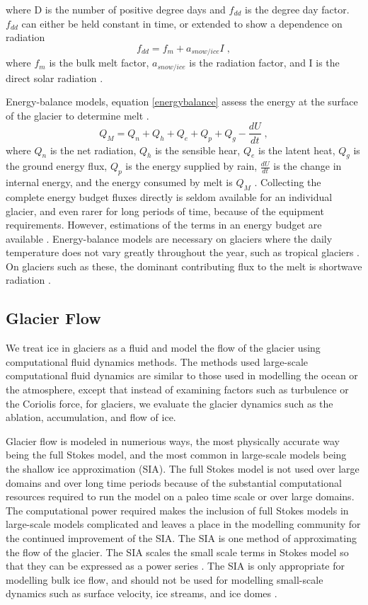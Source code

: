 \documentclass{article}
\begin{document}
where D is the number of positive degree days and $f_{dd}$ is the degree day factor. $f_{dd}$ can either be held constant in time, or extended to show a dependence on radiation
\begin{equation}
f_{dd} = f_m+ a_{snow/ice}I \; ,
\end{equation}
 where $f_m$ is the bulk melt factor, $a_{snow/ice}$ is the radiation factor, and I is the direct solar radiation \citep{Clarke2015}. 

Energy-balance models, equation \ref{energybalance} assess the energy at the surface of the glacier to determine melt \citep{Hock2005}. 
\begin{equation}\label{energybalance}
Q_M = Q_n+Q_h+Q_e+Q_p+Q_g-\frac{dU}{dt} \; ,
\end{equation}
where $Q_n$ is the net radiation, $Q_h$ is the sensible hear, $Q_e$ is the latent heat, $Q_g$ is the ground energy flux, $Q_p$ is the energy supplied by rain, $\frac{dU}{dt}$ is the change in internal energy, and the energy consumed by melt is $Q_M$ \citep{Hock2005, Hooke2013}.  Collecting the complete energy budget fluxes directly is seldom available for an individual glacier, and even rarer for long periods of time, because of the equipment requirements. However, estimations of the terms in an energy budget are available \citep{Hock2005}. Energy-balance models are necessary on glaciers where the daily temperature does not vary greatly throughout the year, such as tropical glaciers \citep{Sicart2008}. On glaciers such as these, the dominant contributing flux to the melt is shortwave radiation \citep{Pradhananga2020, Sicart2008}.

\subsection{Glacier Flow}
We treat ice in glaciers as a fluid and model the flow of the glacier using computational fluid dynamics methods. The methods used large-scale computational fluid dynamics are similar to those used in modelling the ocean or the atmosphere, except that instead of examining factors such as turbulence or the Coriolis force, for glaciers, we evaluate the glacier dynamics such as the ablation, accumulation, and flow of ice. 

Glacier flow is modeled in numerious ways, the most physically accurate way being the full Stokes model, and the most common in large-scale models being the shallow ice approximation (SIA). The full Stokes model is not used over large domains and over long time periods because of the substantial computational resources required to run the model on a paleo time scale or over large domains. The computational power required makes the inclusion of full Stokes models in large-scale models complicated and leaves a place in the modelling community for the continued improvement of the SIA. The SIA is one method of approximating the flow of the glacier. The SIA scales the small scale terms in Stokes model so that they can be expressed as a power series \citep{Kirchner2016, Emmanuel2004}. The SIA is only appropriate for modelling bulk ice flow, and should not be used for modelling small-scale dynamics such as surface velocity, ice streams,  and ice domes \citep{AHLKRONA2016,LEMEUR2004}.
\end{document}
